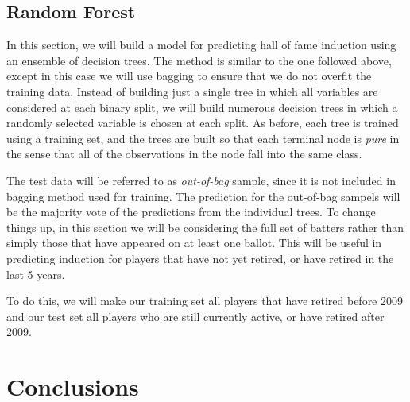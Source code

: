 \documentclass[preprint,12pt]{elsarticle}
\begin{document}


\subsection{Random Forest}
In this section, we will build a model for predicting hall of fame induction using an ensemble of decision trees. The method is similar to the one followed above, except in this case we will use bagging to ensure that we do not overfit the training data. Instead of building just a single tree in which all variables are considered at each binary split, we will build numerous decision trees in which a randomly selected variable is chosen at each split. As before, each tree is trained using a training set, and the trees are built so that each terminal node is \textit{pure} in the sense that all of the observations in the node fall into the same class.

The test data will be referred to as \textit{out-of-bag} sample, since it is not included in bagging method used for training. The prediction for the out-of-bag sampels will be the majority vote of the predictions from the individual trees. To change things up, in this section we will be considering the full set of batters rather than simply those that have appeared on at least one ballot. This will be useful in predicting induction for players that have not yet retired, or have retired in the last 5 years.

To do this, we will make our training set all players that have retired before 2009 and our test set all players who are still currently active, or have retired after 2009. 


\section{Conclusions}
\end{document}

